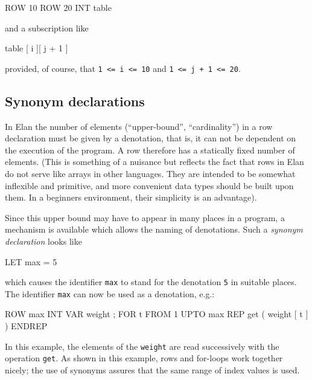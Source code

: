 \begin{elan}
        ROW 10 ROW 20 INT table
\end{elan}

\noindent
and a subscription like

\begin{elan}
        table [ i ][ j + 1 ]
\end{elan}

\noindent
provided, of course, that {\tt 1 <= i <= 10} and {\tt 1 <= j + 1 <= 20}.

\subsection{Synonym declarations}

In Elan the number of elements (``upper-bound'', ``cardinality'')
in a row declaration must be given by a denotation, that is,
it can not be dependent on the execution of the program. A row
therefore has a statically fixed number of elements. (This is
something of a nuisance but reflects the fact that rows in Elan
do not serve like arrays in other languages. They are intended
to be somewhat inflexible and primitive, and more convenient
data types should be built upon them. In a beginners environment,
their simplicity is an advantage).

Since this upper bound may have to appear in many places in a
program, a mechanism is available which allows the naming of
denotations. Such a {\em synonym declaration} looks like

\begin{elan}
        LET max = 5
\end{elan}

\noindent
which causes the identifier {\tt max} to stand for the denotation
{\tt 5} in suitable places.
The identifier {\tt max} can now be used as a denotation, e.g.:

\begin{elan}
        ROW max INT VAR weight ;
        FOR t FROM 1 UPTO max
        REP
          get ( weight [ t ] )
        ENDREP
\end{elan}

\noindent
In this example, the elements of the {\tt weight} are read successively
with the operation {\tt get}. As shown in this example, rows
and for-loops work together nicely; the use of synonyms assures
that the same range of index values is used.

